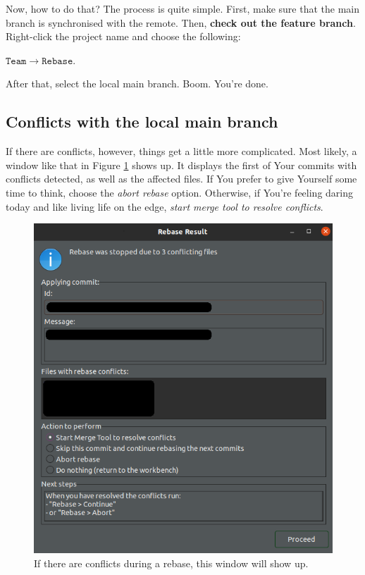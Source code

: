 \documentclass{article}
\begin{document}
Now, how to do that? The process is quite simple. First, make sure that the main branch is synchronised with the remote. Then, \textbf{check out the feature branch}. Right-click the project name and choose the following:\newline

$\mathtt{Team\rightarrow Rebase}.$\newline

After that, select the local main branch. Boom. You're done.

\subsection{Conflicts with the local main branch}

If there are conflicts, however, things get a little more complicated. Most likely, a window like that in Figure \ref{fig:rebase_result} shows up. It displays the first of Your commits with conflicts detected, as well as the affected files. If You prefer to give Yourself some time to think, choose the \textit{abort rebase} option. Otherwise, if You're feeling daring today and like living life on the edge, \textit{start merge tool to resolve conflicts}.

\begin{figure}[h]
    \centering
    \includegraphics[scale=0.5]{rebase_result.png}
    \caption{If there are conflicts during a rebase, this window will show up.}
    \label{fig:rebase_result}
\end{figure}
\end{document}
